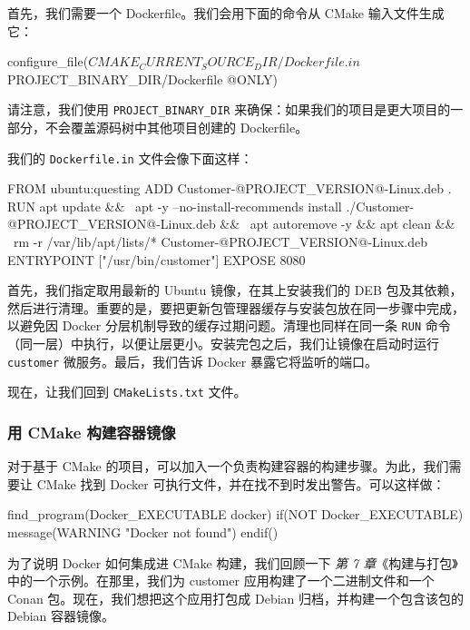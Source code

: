 \label{idx:1782}
\label{idx:1783}
首先，我们需要一个 Dockerfile。我们会用下面的命令从 CMake 输入文件生成它：

\begin{codebox}[text]
configure_file(${CMAKE_CURRENT_SOURCE_DIR}/Dockerfile.in
                ${PROJECT_BINARY_DIR}/Dockerfile @ONLY)
\end{codebox}

请注意，我们使用 \texttt{PROJECT\_\allowbreak{}BINARY\_\allowbreak{}DIR} 来确保：如果我们的项目是更大项目的一部分，不会覆盖源码树中其他项目创建的 Dockerfile。

我们的 \texttt{Dockerfile.\allowbreak{}in} 文件会像下面这样：

\begin{codebox}[docker]
FROM ubuntu:questing
ADD Customer-@PROJECT_VERSION@-Linux.deb .
RUN apt update && \
    apt -y --no-install-recommends install ./Customer-@PROJECT_VERSION@-Linux.deb && \
    apt autoremove -y && apt clean && \
    rm -r /var/lib/apt/lists/* Customer-@PROJECT_VERSION@-Linux.deb
ENTRYPOINT ["/usr/bin/customer"]
EXPOSE 8080
\end{codebox}

\label{idx:1784}
\label{idx:1785}
首先，我们指定取用最新的 Ubuntu 镜像，在其上安装我们的 DEB 包及其依赖，然后进行清理。重要的是，要把更新包管理器缓存与安装包放在同一步骤中完成，以避免因 Docker 分层机制导致的缓存过期问题。清理也同样在同一条 \texttt{RUN} 命令（同一层）中执行，以便让层更小。安装完包之后，我们让镜像在启动时运行 \texttt{customer} 微服务。最后，我们告诉 Docker 暴露它将监听的端口。

现在，让我们回到 \texttt{CMake\allowbreak{}Lists.\allowbreak{}txt} 文件。

\subsubsection{用 CMake 构建容器镜像}

\label{idx:1786}
\label{idx:1787}
对于基于 CMake 的项目，可以加入一个负责构建容器的构建步骤。为此，我们需要让 CMake 找到 Docker 可执行文件，并在找不到时发出警告。可以这样做：

\begin{codebox}[cmake]
find_program(Docker_EXECUTABLE docker)
 if(NOT Docker_EXECUTABLE)
   message(WARNING "Docker not found")
 endif()
\end{codebox}

为了说明 Docker 如何集成进 CMake 构建，我们回顾一下 \emph{第 7 章}《构建与打包》中的一个示例。在那里，我们为 customer 应用构建了一个二进制文件和一个 Conan 包。现在，我们想把这个应用打包成 Debian 归档，并构建一个包含该包的 Debian 容器镜像。

